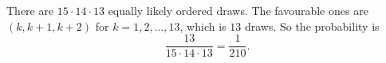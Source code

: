 There are $15\cdot14\cdot13$ equally likely ordered draws. The favourable ones are $(k,k+1,k+2)$ for $k=1,2,\dots,13$, which is $13$ draws. So the probability is
\[
\dfrac{13}{15\cdot14\cdot13}=\boxed{\dfrac{1}{210}}.
\]
